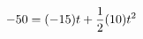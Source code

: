 \documentclass[preview]{standalone}
\begin{document}
\begin{align*}
\special{dvisvgm:raw <g id='unique000'>}-50 = (-15)t + \frac{1}{2} (10) t^2\special{dvisvgm:raw </g>}
\end{align*}
\end{document}
